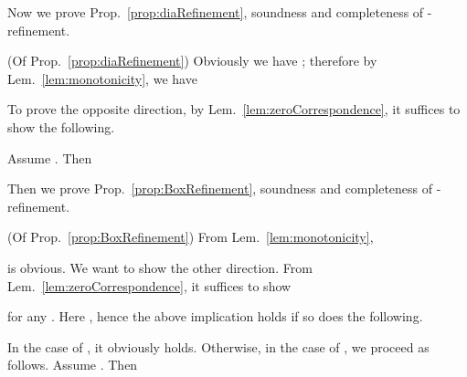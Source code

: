 \documentclass[envcountsect,orivec]{llncs} \usepackage{etex} \usepackage[]{graphicx}
\begin{document}
Now we prove Prop.~\ref{prop:diaRefinement}, soundness and completeness of -refinement.
\begin{myproof} (Of Prop.~\ref{prop:diaRefinement})
  Obviously we have
 ; therefore by Lem.~\ref{lem:monotonicity}, we have  
  
To prove the opposite direction, by Lem.~\ref{lem:zeroCorrespondence}, 
  it suffices to show the following.
  
  Assume .
  Then
  
\end{myproof}


Then we prove Prop.~\ref{prop:BoxRefinement}, soundness and completeness
of -refinement.
\begin{myproof} (Of Prop.~\ref{prop:BoxRefinement})
  From Lem.~\ref{lem:monotonicity}, 
  
  is obvious.
  We want to show the other direction.
  From Lem.~\ref{lem:zeroCorrespondence},
  it suffices to show 
  
  for any .
  Here ,
  hence 
  the above implication holds if so does the following.
    
  In the case of ,
  it obviously holds.
  Otherwise,
  in the case of ,
  we proceed as follows.
  Assume .
  Then 
  
\end{myproof}
\end{document}

